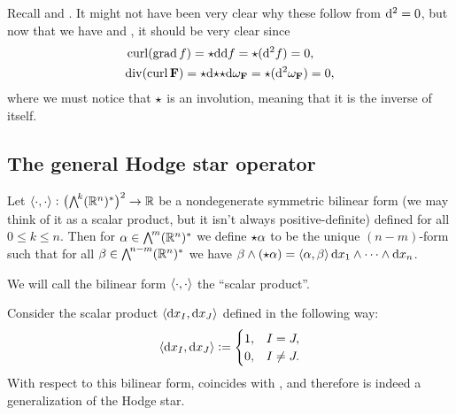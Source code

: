 \documentclass[11pt,a4paper]{article}
\renewcommand{\div}{\mathrm{div}}
\begin{document}
\begin{remark}
  Recall  and .
  It might not have been very clear why these follow from $\mathrm{d}^2 = 0$,
  but now that we have  and ,
  it should be very clear since
  \begin{align*}
    &\curl(\grad f) = \hodge \dif \dif f = \hodge (\dif^2 f) = 0, \\
    &\div(\curl \vec F) = \hodge \dif \hodge \hodge \dif \omega_{\vec F} =
      \hodge (\dif^2 \omega_{\vec F}) = 0,
  \end{align*}
  where we must notice that ${\mathnormal{\star}}$ is an involution,
  meaning that it is the inverse of itself.
\end{remark}

\subsection{The general Hodge star operator}

\begin{definition}
  \label{def:hodge-general}
  Let $\ip{\cdot}{\cdot} \colon \del[1]{\bigwedge^{\!k}(\R^n)^*}^{2} \to \R$
  be a nondegenerate symmetric bilinear form (we may think of it as a scalar
  product, but it isn't always positive-definite) defined for all $0 \le k \le n$.
  Then for $\alpha \in \bigwedge^{\!m}(\mathbb{R}^n)^*$
  we define ${\mathnormal{\star}} \alpha$ to be the unique $(n-m)$-form such that
  for all $\beta \in \bigwedge^{\!n-m}(\mathbb{R}^n)^*$ we have
  $\beta \wedge (\hodge \alpha) = \ip{\alpha}{\beta} \dx_1 \wedge \cdots \wedge \dx_n$.
\end{definition}

\begin{remark}
  We will call the bilinear form $\left\langle \cdot, \cdot \right\rangle$ the ``scalar product''.
\end{remark}

\begin{example}
  \label{exmp:standard-hodge}
  Consider the scalar product $\ip{\dx_I}{\dx_J}$ defined in the following way:
  \[
    \ip{\dx_I}{\dx_J} :=
    \begin{cases}
      1, &I = J, \\
      0, &I \neq J.
    \end{cases}
  \]
  With respect to this bilinear form,  coincides
  with , and therefore  is indeed
  a generalization of the Hodge star.
\end{example}
\end{document}

